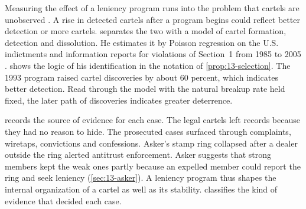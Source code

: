 Measuring the effect of a leniency program runs into the problem that cartels are unobserved
\citep[p.~209]{AskerNocke2021}. A rise in detected cartels after a program begins could reflect better detection or
more cartels. \citet{Miller2009} separates the two with a model of cartel formation, detection and dissolution. He
estimates it by Poisson regression on the U.S. indictments and information reports for violations of Section~1 from
1985 to 2005 \citep[pp.~186--187]{AskerNocke2021}.  shows the logic of his identification in
the notation of \cref{prop:13-selection}. The 1993 program raised cartel discoveries by about 60 percent, which
indicates better detection. Read through the model with the natural breakup rate held fixed, the later path of
discoveries indicates greater deterrence.

 records the source of evidence for each case. The legal cartels left records because they
had no reason to hide. The prosecuted cases surfaced through complaints, wiretaps, convictions and confessions. Asker's
stamp ring collapsed after a dealer outside the ring alerted antitrust enforcement. Asker suggests that strong
members kept the weak ones partly because an expelled member could report the ring and seek leniency
(\cref{sec:13-asker}). A leniency program thus shapes the internal organization of a cartel as well as its
stability.  classifies the kind of evidence that decided each case.

